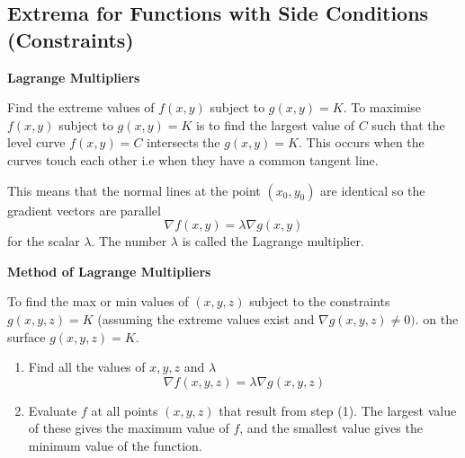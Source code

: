 \documentclass[11pt,a4paper]{article}
\theoremstyle{definition}
\newcommand{\subhead}[1]{%
  \par\medskip\noindent\textbf{#1}\par\nobreak\smallskip}
\begin{document}
{\color[wave]{485}\subsection{Extrema for Functions with Side Conditions (Constraints)}}

\subhead{Lagrange Multipliers}


Find the extreme values of $f(x,y)$ subject to $g(x,y) =K$. To maximise $f(x,y)$ subject to $g(x,y) = K$ is to find the largest value of $C$ such that the level curve $f(x,y) = C$ intersects the $g(x,y) = K$. This occurs when the curves touch each other i.e when they have a common tangent line.


\begin{figure}[H]
\centering
{}
\end{figure}

This means that the normal lines at the point $(x_0,y_0)$ are identical so the gradient vectors are parallel $$ \nabla f(x,y) = \lambda \nabla g(x,y)$$ for the scalar $\lambda$. The number $\lambda$ is called the Lagrange multiplier.


\subhead{Method of Lagrange Multipliers}


To find the max or min values of $(x,y,z)$ subject to the constraints $g(x,y,z) = K$ (assuming the extreme values exist and $\nabla g(x,y,z) \neq 0)$. on the surface $g(x,y,z) = K$.
\begin{enumerate}
\item Find all the values of $x, y, z$ and $\lambda$ $$\nabla f(x,y,z) = \lambda \nabla g(x,y,z)$$

\item Evaluate $f$ at all points $(x,y,z)$ that result from step (1). The largest value of these gives the maximum value of $f$, and the smallest value gives the minimum value of the function.
\end{enumerate}
\end{document}

